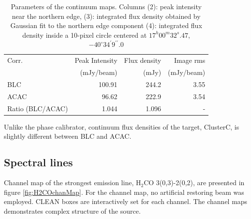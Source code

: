 \documentclass[a4paper, 10pt]{scrartcl}
\begin{document}
\begin{table}[h]
\centering
\caption{Parameters of the continuum maps. Columns (2): peak intensity near the northern edge, (3): integrated flux density obtained by Gaussian fit to the northern edge component (4): integrated flux density inside a 10-pixel circle centered at $17^h 00^m 32^s.47$, $-40^{\circ} 34^{\prime} 9^{\prime \prime}.0$ }
\label{tab:contimage}
\begin{tabular}{l|r|r|r} \hline \hline
Corr.  & Peak Intensity   & Flux density  & Image rms\\
       & (mJy/beam)       & (mJy)         & (mJy/beam) \\ \hline
BLC    & 100.91           & 244.2         & 3.55   \\
ACAC   &  96.62           & 222.9         & 3.54   \\ 
Ratio (BLC/ACAC) & 1.044  & 1.096         & -          \\ \hline
\end{tabular}
\end{table}

Unlike the phase calibrator, continuum flux densities of the target, ClusterC, is slightly different between BLC and ACAC.

\subsection{Spectral lines}\label{subsec:lineimages}
Channel map of the strongest emission line, H$_2$CO 3(0,3)-2(0,2), are presented in figure \ref{fig:H2COchanMap}. For the channel map, no artificial restoring beam was employed. CLEAN boxes are interactively set for each channel. The channel maps demonstrates complex structure of the source.  
\end{document}
